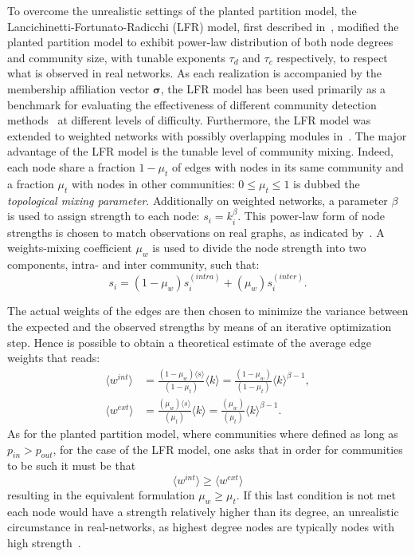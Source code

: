 \documentclass[11pt,              a4paper,              twoside,openright,              titlepage,              headinclude,footinclude,                            numbers=noenddot,              cleardoublepage=empty,]{scrreprt}
\begin{document}
To overcome the unrealistic settings of the planted partition model, the Lancichinetti\hyp{}Fortunato\hyp{}Radicchi (LFR) model, first described in~\cite{lancichinetti2008}, modified the planted partition model to exhibit power-law distribution of both node degrees and community size, with tunable exponents $\tau_d$ and $\tau_c$ respectively, to respect what is observed in real networks.
As each realization is accompanied by the membership affiliation vector $\boldsymbol \sigma$, the LFR model has been used primarily as a benchmark for evaluating the effectiveness of different community detection methods~\cite{fortunato2010,lancichinetti2009} at different levels of difficulty.
Furthermore, the LFR model was extended to weighted networks with possibly overlapping modules in~\cite{lancichinetti2009a}.
The major advantage of the LFR model is the tunable level of community mixing.
Indeed, each node share a fraction $1-\mu_t$ of edges with nodes in its same community and a fraction $\mu_t$ with nodes in other communities: $0 \leq \mu_t \leq 1$ is dubbed the \emph{topological mixing parameter}.
Additionally on weighted networks, a parameter $\beta$ is used to assign strength to each node: $s_i=k_i^\beta$.
This power-law form of node strengths is chosen to match observations on real graphs, as indicated by~\cite{barrat2004}.
A weights-mixing coefficient $\mu_w$ is used to divide the node strength into two components, intra- and inter community, such that:
$$s_i = (1-\mu_w)s_i^{(intra)} + (\mu_w)s_i^{(inter)}.$$

The actual weights of the edges are then chosen to minimize the variance between the expected and the observed strengths by means of an iterative optimization step.
Hence is possible to obtain a theoretical estimate of the average edge weights that reads:
\begin{align}
\langle  w^{int} \rangle &= \frac{(1-\mu_w)\langle  s\rangle }{(1-\mu_t)}\langle  k\rangle = \frac{(1-\mu_w)}{(1-\mu_t)}\langle  k \rangle ^{\beta-1}, \\
\langle  w^{ext} \rangle &= \frac{(\mu_w)\langle  s\rangle }{(\mu_t)}\langle  k\rangle = \frac{(\mu_w)}{(\mu_t)}\langle  k \rangle ^{\beta-1}.
\end{align}
As for the planted partition model, where communities where defined as long as $p_{in}>p_{out}$, for the case of the LFR model, one asks that in order for communities to be such it must be that
\begin{equation}
\langle  w^{int} \rangle \geq \langle  w^{ext} \rangle 
\end{equation}
resulting in the equivalent formulation $\mu_w  \geq \mu_t$.
If this last condition is not met each node would have a strength relatively higher than its degree, an unrealistic circumstance in real-networks, as highest degree nodes are typically nodes with high strength~\cite{barrat2004}.
\end{document}

